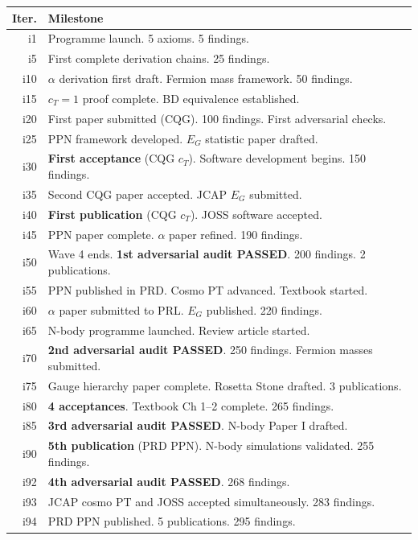 \documentclass[11pt,a4paper]{article}
\begin{document}
\begin{center}
\begin{longtable}{rp{12cm}}
\toprule
\textbf{Iter.} & \textbf{Milestone} \\
\midrule
\endfirsthead
\midrule
\endhead
i1 & Programme launch. 5 axioms. 5 findings. \\
i5 & First complete derivation chains. 25 findings. \\
i10 & $\alpha$ derivation first draft. Fermion mass framework. 50 findings. \\
i15 & $c_T = 1$ proof complete. BD equivalence established. \\
i20 & First paper submitted (CQG). 100 findings. First adversarial checks. \\
i25 & PPN framework developed. $E_G$ statistic paper drafted. \\
i30 & \textbf{First acceptance} (CQG $c_T$). Software development begins. 150 findings. \\
i35 & Second CQG paper accepted. JCAP $E_G$ submitted. \\
i40 & \textbf{First publication} (CQG $c_T$). JOSS software accepted. \\
i45 & PPN paper complete. $\alpha$ paper refined. 190 findings. \\
i50 & Wave 4 ends. \textbf{1st adversarial audit PASSED}. 200 findings. 2 publications. \\
i55 & PPN published in PRD. Cosmo PT advanced. Textbook started. \\
i60 & $\alpha$ paper submitted to PRL. $E_G$ published. 220 findings. \\
i65 & N-body programme launched. Review article started. \\
i70 & \textbf{2nd adversarial audit PASSED}. 250 findings. Fermion masses submitted. \\
i75 & Gauge hierarchy paper complete. Rosetta Stone drafted. 3 publications. \\
i80 & \textbf{4 acceptances}. Textbook Ch 1--2 complete. 265 findings. \\
i85 & \textbf{3rd adversarial audit PASSED}. N-body Paper I drafted. \\
i90 & \textbf{5th publication} (PRD PPN). N-body simulations validated. 255 findings. \\
i92 & \textbf{4th adversarial audit PASSED}. 268 findings. \\
i93 & JCAP cosmo PT and JOSS accepted simultaneously. 283 findings. \\
i94 & PRD PPN published. 5 publications. 295 findings. \\

\end{longtable}
\end{center}
\end{document}
